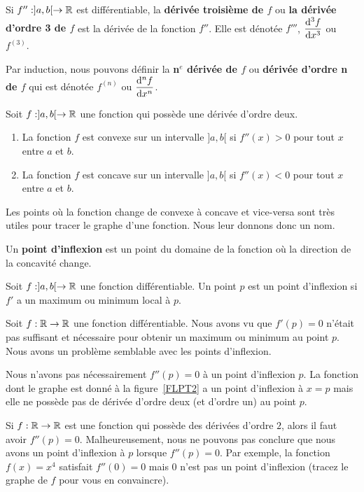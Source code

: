{\begin{defn}
Si $f'':]a,b[\to \mathbb{R}$ est différentiable, la
{\bfseries dérivée troisième de $f$} ou
{\bfseries la dérivée d'ordre 3 de $f$} est la dérivée de la fonction
$f''$.  Elle est dénotée $f'''$, $\displaystyle \frac{\mathrm{d}^{3}f}{\mathrm{d}x^{3}}$ ou
$f^{(3)}$.

Par induction, nous pouvons définir la {\bfseries n$^e$ dérivée de $f$} 
ou {\bfseries dérivée d'ordre n de $f$} qui
est dénotée $f^{(n)}$ ou $\displaystyle \frac{\mathrm{d}^{n}f}{\mathrm{d}x^{n}}$.
\end{defn}

\begin{prop}\label{seccondDerCon}
Soit $f:]a,b[\rightarrow \mathbb{R}$ une fonction qui possède une dérivée
d'ordre deux.
\begin{enumerate}
\item La fonction $f$ est convexe sur un intervalle $]a,b[$ si
$f''(x)>0$ pour tout $x$ entre $a$ et $b$.
\item La fonction $f$ est concave sur un intervalle $]a,b[$ si
$f''(x)<0$ pour tout $x$ entre $a$ et $b$.
\end{enumerate}
\end{prop}

Les points où la fonction change de convexe à concave et vice-versa
sont très utiles pour tracer le graphe d'une fonction.  Nous leur donnons
donc un nom.

\begin{defn}  
Un {\bfseries point d'inflexion} est un point du domaine de la
fonction où la direction de la concavité change.
\end{defn}

\begin{prop}
Soit $f:]a,b[ \to \mathbb{R}$ une fonction différentiable.  Un point $p$ est
un point d'inflexion si $f'$ a un maximum ou minimum local à $p$.
\end{prop}

\begin{rmk}
Soit $f:\mathbb{R}\rightarrow \mathbb{R}$ une fonction différentiable.  Nous avons vu que
$f'(p) = 0$ n'était pas suffisant et nécessaire pour obtenir un
maximum ou minimum au point $p$.  Nous avons un problème semblable avec les
points d'inflexion.

Nous n'avons pas nécessairement $f''(p)=0$ à un point d'inflexion $p$.  
La fonction dont le graphe est donné à la figure~\ref{FLPT2} a un
point d'inflexion à $x=p$ mais elle ne possède pas de dérivée d'ordre
deux (et d'ordre un) au point $p$.

Si $f:\mathbb{R}\rightarrow \mathbb{R}$ est une fonction qui possède des dérivées
d'ordre $2$, alors il faut avoir $f''(p) = 0$.  Malheureusement, nous ne
pouvons pas conclure que nous avons un point d'inflexion à $p$ lorsque
$f''(p)=0$.   Par exemple, la fonction $f(x) = x^4$ satisfait
$f''(0) = 0$ mais $0$ n'est pas un point d'inflexion (tracez le graphe
de $f$ pour vous en convaincre).


\end{rmk}}
